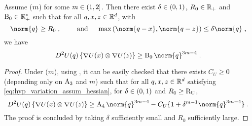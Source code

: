 \begin{lemma}
\label{lem:variation_assum_hessian}
Assume ($m$) for some $m \in \left(1,2\right]$.
Then there exist $\delta \in \left(0,1\right)$, $R_0 \in \mathbb{R}_+$ and  $\operatorname{B}_0 \in \mathbb{R}_+^*$ such that for all $q,x,z \in \mathbb{R}^d$, with
\begin{equation}
\label{eq:hyp_variation_assum_hessian}
\norm{\q} \geq R_0 \eqsp, \qquad \text{ and } \quad \max\parenthese{\norm{\q-\x},\norm{\q-z}} \leq \delta \norm{\q}  \eqsp,
\end{equation}
we have
\begin{equation}
D^2 \F(\q) \defEns{\nabla \F(\x) \otimes \nabla \F(z)} \geq \BB_0 \norm{\q}^{3\m-4}  \eqsp.
\end{equation}
\end{lemma}
\begin{proof}
Under ($m$), using , it can be easily checked that there
exists $C_U \geq 0$ (depending only on $\operatorname{A}_3$ and $m$) such that for all  $q,x,z \in \mathbb{R}^d$ satisfying  \eqref{eq:hyp_variation_assum_hessian},
for $\delta \in \left(0,1\right)$ and $R_0 \geq \operatorname{R_U}$,
\begin{equation}
D^2 \F(\q) \defEns{\nabla \F(\x) \otimes \nabla \F(z)}  \geq \consttwo  \norm{\q}^{3\m-4} - C_U \{1+ \delta^{m-1} \norm{\q}^{3m-4}\}\eqsp.
\end{equation}
The proof is concluded by taking $\delta$ sufficiently small and $R_0$ sufficiently large.
\end{proof}

